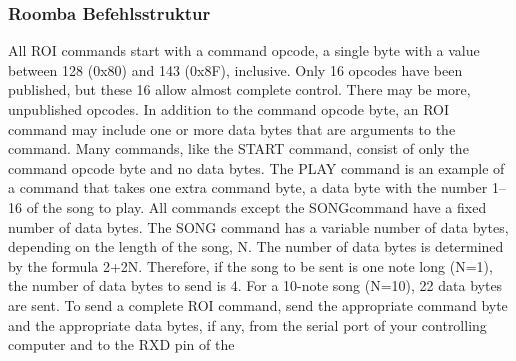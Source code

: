 \subsubsection{Roomba Befehlsstruktur}
All ROI commands start with a command opcode, a single byte with a value between 128 (0x80) and 143 (0x8F), inclusive. Only 16 opcodes have been published, but these 16 allow almost complete control. There may be more, unpublished opcodes. In addition to the command opcode byte, an ROI command may include one or more data bytes that are arguments to the command. Many commands, like the START command, consist of only the command opcode byte and no data bytes. The PLAY command is an example of a command that takes one extra command byte, a data byte with the number 1–16 of the song to play. All commands except the SONGcommand have a fixed number of data bytes. The SONG command has a variable number of data bytes, depending on the length of the song, N. The number of data bytes is determined by the formula 2+2N. Therefore, if the song to be sent is one note long (N=1), the number of data bytes to send is 4. For a 10-note song (N=10), 22 data bytes are sent. To send a complete ROI command, send the appropriate command byte and the appropriate data bytes, if any, from the serial port of your controlling computer and to the RXD pin of the
